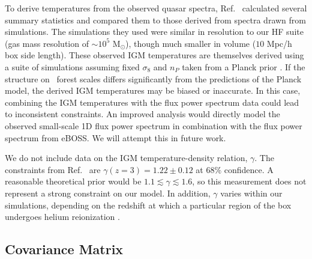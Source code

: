 To derive temperatures from the observed quasar spectra, Ref.~\cite{2021MNRAS.506.4389G} calculated several summary statistics and compared them to those derived from spectra drawn from simulations.
The simulations they used were similar in resolution to our HF suite (gas mass resolution of $\sim10^5$ M$_{\odot}$), though much smaller in volume ($10$ Mpc/h box side length).
These observed IGM temperatures are themselves derived using a suite of simulations assuming fixed $\sigma_8$ and $n_P$ taken from a Planck prior \cite{2021MNRAS.506.4389G}. If the structure on \Lya~forest scales differs significantly from the predictions of the Planck model, the derived IGM temperatures may be biased or inaccurate. In this case, combining the IGM temperatures with the flux power spectrum data could lead to inconsistent constraints. An improved analysis would directly model the observed small-scale 1D flux power spectrum in combination with the flux power spectrum from eBOSS. We will attempt this in future work.

We do not include data on the IGM temperature-density relation, $\gamma$. The constraints from Ref.~\cite{2021MNRAS.506.4389G} are $\gamma(z=3) = 1.22 \pm 0.12$ at $68\%$ confidence. A reasonable theoretical prior would be $1.1 \lesssim \gamma \lesssim 1.6$, so this measurement does not represent a strong constraint on our model. In addition, $\gamma$ varies within our simulations, depending on the redshift at which a particular region of the box undergoes helium reionization \cite{2020MNRAS.496.4372U}.


\subsection{Covariance Matrix}
\label{sec:theoryerror}

